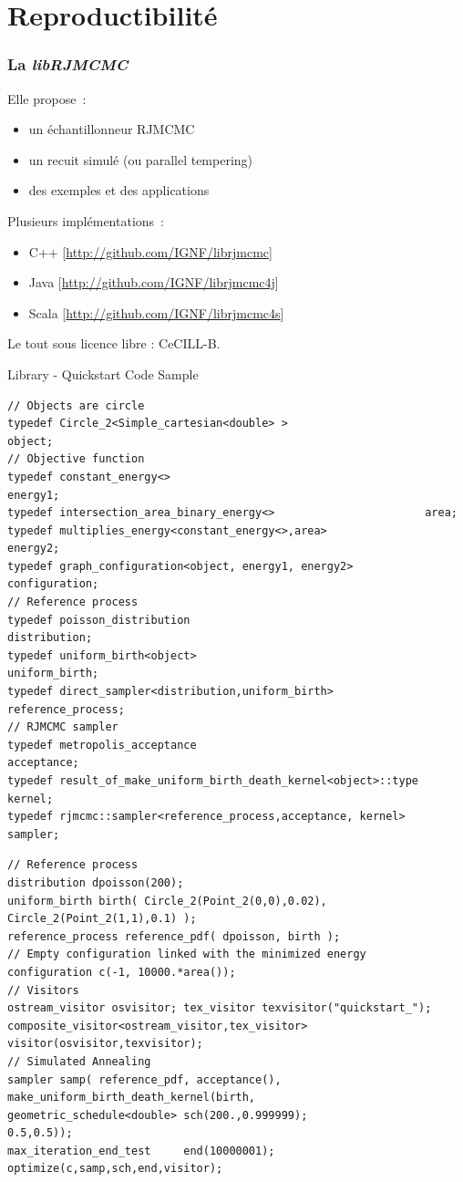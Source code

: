 \documentclass{beamer}
\begin{document}
\section{Reproductibilité}
\begin{frame}
\frametitle{La \emph{libRJMCMC}}
Elle propose~:
\begin{itemize}
\item un \'echantillonneur RJMCMC
\item un recuit simul\'e (ou parallel tempering)
\item des exemples et des applications
\end{itemize}
Plusieurs impl\'ementations~:
\begin{itemize}
\item C++ \small[\url{http://github.com/IGNF/librjmcmc}]
\item Java \small[\url{http://github.com/IGNF/librjmcmc4j}]
\item Scala \small[\url{http://github.com/IGNF/librjmcmc4s}]
\end{itemize}
Le tout sous licence libre : CeCILL-B.
\end{frame}


\begin{frame}[containsverbatim]{Library - Quickstart Code Sample}
\tiny
\begin{lstlisting}
// Objects are circle
typedef Circle_2<Simple_cartesian<double> >                     object;
// Objective function
typedef constant_energy<>                                       energy1;
typedef intersection_area_binary_energy<>                       area;
typedef multiplies_energy<constant_energy<>,area>               energy2;
typedef graph_configuration<object, energy1, energy2>           configuration;
// Reference process
typedef poisson_distribution                                    distribution;
typedef uniform_birth<object>                                   uniform_birth;
typedef direct_sampler<distribution,uniform_birth>              reference_process;
// RJMCMC sampler
typedef metropolis_acceptance                                   acceptance;
typedef result_of_make_uniform_birth_death_kernel<object>::type kernel;
typedef rjmcmc::sampler<reference_process,acceptance, kernel>   sampler;
\end{lstlisting}
\begin{lstlisting}
// Reference process
distribution dpoisson(200);
uniform_birth birth( Circle_2(Point_2(0,0),0.02), Circle_2(Point_2(1,1),0.1) );
reference_process reference_pdf( dpoisson, birth );
// Empty configuration linked with the minimized energy
configuration c(-1, 10000.*area());
// Visitors
ostream_visitor osvisitor; tex_visitor texvisitor("quickstart_");
composite_visitor<ostream_visitor,tex_visitor>  visitor(osvisitor,texvisitor);
// Simulated Annealing
sampler samp( reference_pdf, acceptance(), make_uniform_birth_death_kernel(birth,
geometric_schedule<double> sch(200.,0.999999);                         0.5,0.5));
max_iteration_end_test     end(10000001);
optimize(c,samp,sch,end,visitor);
\end{lstlisting}

\end{frame}
\end{document}
